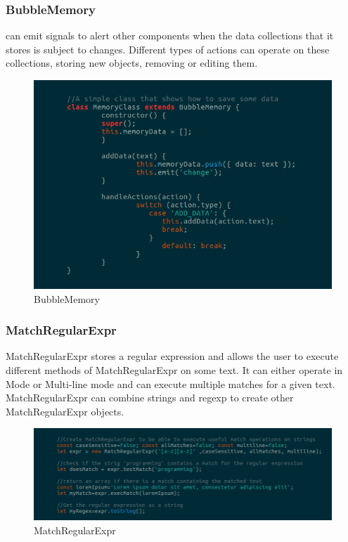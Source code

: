 \subsubsection{BubbleMemory}
 can emit signals to alert other components when the data collections that it stores is subject to changes. Different types of actions can operate on these collections, storing new objects, removing or editing them. 
\begin{figure}[H]
	\centering
	\includegraphics[width=14cm]{../../documenti/UserManualFramework/framework_model/4framework_model_memory.png}
	\caption{BubbleMemory}
\end{figure}

\subsubsection{MatchRegularExpr}
MatchRegularExpr stores a regular expression and allows the user to execute different methods of MatchRegularExpr on some text.
It can either operate in  Mode or Multi-line mode and can execute multiple matches for a given text.
MatchRegularExpr can combine strings and regexp to create other MatchRegularExpr objects.
\begin{figure}[H]
	\centering
	\includegraphics[width=14cm]{../../documenti/UserManualFramework/framework_model/5framework_model_regexp1.png}
	\caption{MatchRegularExpr}
\end{figure}

